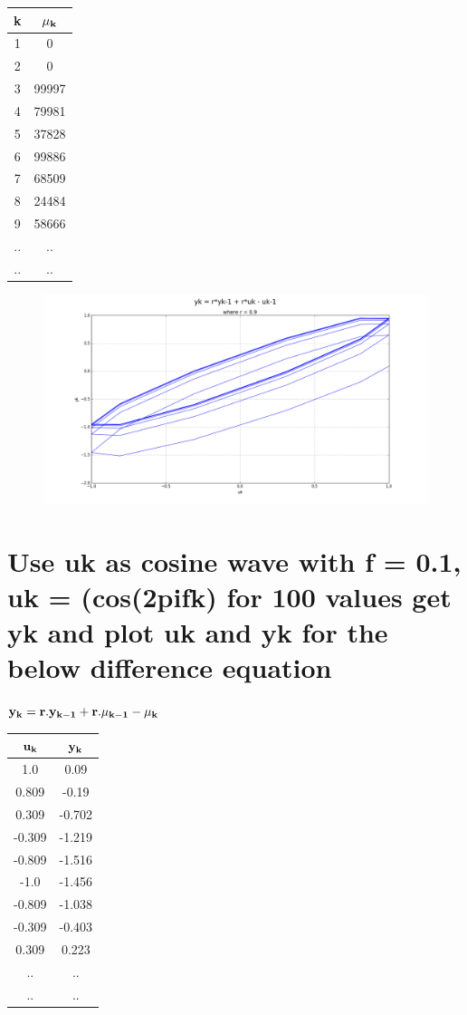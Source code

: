 \documentclass[a4paper,10pt]{article}
\begin{document}
\begin{center}
\begin{tabular}[!hbt]{| c | c |}
\hline
  \bf{k} & $\bf{\mu_k}$ \\
  \hline
 1 & 0\\ 
 2 & 0\\  
 3 & 99997 \\
 4 & 79981 \\
 5 & 37828 \\
 6 & 99886 \\
 7 & 68509 \\
 8 & 24484 \\
 9 & 58666 \\
 .. & .. \\
 .. & .. \\
 \hline
\end{tabular}
\end{center}

\begin{center}
 \begin{figure}[!hbt]
  \includegraphics[scale=0.33]{figure_1.png}
 \end{figure}
\end{center}

\pagebreak
  \section{Use uk as cosine wave with f = 0.1, uk = (cos(2pifk) for 100 values get yk and  plot uk and yk for the below difference equation}
    $\bf{y_k = r.y_{k-1} + r.\mu_{k-1} - \mu_k}$
    
\begin{center}
\begin{tabular}[!hbt]{| c | c |}
\hline
  $\bf{u_k}$ & $\bf{y_k}$ \\
  \hline
 1.0 & 0.09\\ 
 0.809 & -0.19\\  
 0.309 & -0.702 \\
 -0.309 & -1.219 \\
 -0.809 & -1.516 \\
 -1.0 & -1.456 \\
 -0.809 & -1.038 \\
 -0.309 & -0.403 \\
 0.309 & 0.223 \\
 .. & .. \\
 .. & .. \\
 \hline
\end{tabular}
\end{center}
\end{document}
